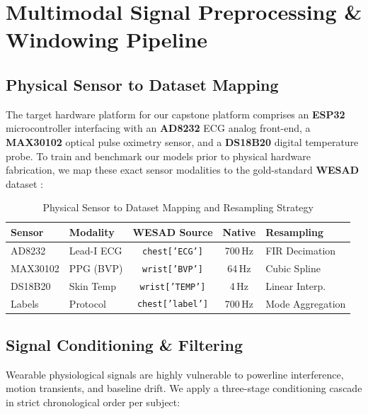 \documentclass[conference]{IEEEtran}
\begin{document}
\section{Multimodal Signal Preprocessing \& Windowing Pipeline}

\subsection{Physical Sensor to Dataset Mapping}
The target hardware platform for our capstone platform comprises an \textbf{ESP32} microcontroller interfacing with an \textbf{AD8232} ECG analog front-end, a \textbf{MAX30102} optical pulse oximetry sensor, and a \textbf{DS18B20} digital temperature probe. To train and benchmark our models prior to physical hardware fabrication, we map these exact sensor modalities to the gold-standard \textbf{WESAD} dataset \cite{schmidt2018}:

\begin{table}[htbp]
\caption{Physical Sensor to Dataset Mapping and Resampling Strategy}
\label{tab:sensor_mapping}
\centering
\footnotesize
\begin{tabularx}{\columnwidth}{@{}lXccX@{}}
\toprule
\textbf{Sensor} & \textbf{Modality} & \textbf{WESAD Source} & \textbf{Native} & \textbf{Resampling} \\
\midrule
AD8232 & Lead-I ECG & \texttt{chest['ECG']} & 700\,Hz & FIR Decimation \\
MAX30102 & PPG (BVP) & \texttt{wrist['BVP']} & 64\,Hz & Cubic Spline \\
DS18B20 & Skin Temp & \texttt{wrist['TEMP']} & 4\,Hz & Linear Interp. \\
Labels & Protocol & \texttt{chest['label']} & 700\,Hz & Mode Aggregation \\
\bottomrule
\end{tabularx}
\end{table}

\subsection{Signal Conditioning \& Filtering}
Wearable physiological signals are highly vulnerable to powerline interference, motion transients, and baseline drift. We apply a three-stage conditioning cascade in strict chronological order per subject:
\end{document}
